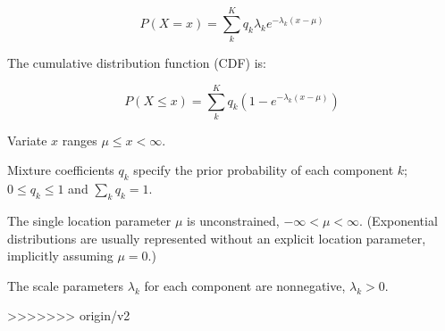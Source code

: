 \begin{equation}
P(X=x) = \sum_k^{K} q_k \lambda_k e^{- \lambda_k (x - \mu)}
\label{eqn:hyperexp_pdf}
\end{equation}

The cumulative distribution function (CDF) is:

\begin{equation}
P(X \leq x) = \sum_k^{K} q_k (1 - e^{- \lambda_k (x - \mu)})
\label{eqn:hyperexp_cdf}
\end{equation}

Variate $x$ ranges $\mu \leq x < \infty$.

Mixture coefficients $q_k$ specify the prior probability of each
component $k$; $0 \leq q_k \leq 1$ and $\sum_k q_k = 1$.

The single location parameter $\mu$ is unconstrained, $-\infty < \mu <
\infty$. (Exponential distributions are usually represented without an
explicit location parameter, implicitly assuming $\mu = 0$.)

The scale parameters $\lambda_k$ for each component are nonnegative,
$\lambda_k > 0$.


>>>>>>> origin/v2
